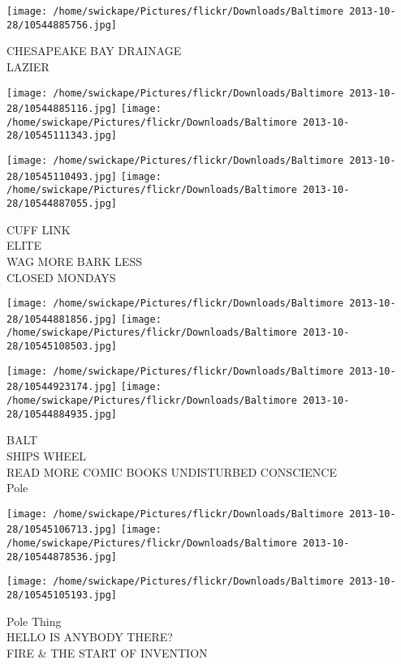 \documentclass[10pt,letterpaper]{article}
\begin{document}
\vspace{0.25in}
\texttt{[image: /home/swickape/Pictures/flickr/Downloads/Baltimore 2013-10-28/10544885756.jpg]}

CHESAPEAKE BAY DRAINAGE\\
LAZIER\\
\pagebreak

\texttt{[image: /home/swickape/Pictures/flickr/Downloads/Baltimore 2013-10-28/10544885116.jpg]}
\texttt{[image: /home/swickape/Pictures/flickr/Downloads/Baltimore 2013-10-28/10545111343.jpg]}

\texttt{[image: /home/swickape/Pictures/flickr/Downloads/Baltimore 2013-10-28/10545110493.jpg]}
\texttt{[image: /home/swickape/Pictures/flickr/Downloads/Baltimore 2013-10-28/10544887055.jpg]}

CUFF LINK\\
ELITE\\
WAG MORE BARK LESS\\
CLOSED MONDAYS\\
\pagebreak

\texttt{[image: /home/swickape/Pictures/flickr/Downloads/Baltimore 2013-10-28/10544881856.jpg]}
\texttt{[image: /home/swickape/Pictures/flickr/Downloads/Baltimore 2013-10-28/10545108503.jpg]}

\texttt{[image: /home/swickape/Pictures/flickr/Downloads/Baltimore 2013-10-28/10544923174.jpg]}
\texttt{[image: /home/swickape/Pictures/flickr/Downloads/Baltimore 2013-10-28/10544884935.jpg]}

BALT\\
SHIPS WHEEL\\
READ MORE COMIC BOOKS UNDISTURBED CONSCIENCE\\
Pole\\
\pagebreak

\texttt{[image: /home/swickape/Pictures/flickr/Downloads/Baltimore 2013-10-28/10545106713.jpg]}
\texttt{[image: /home/swickape/Pictures/flickr/Downloads/Baltimore 2013-10-28/10544878536.jpg]}

\vspace{0.25in}
\texttt{[image: /home/swickape/Pictures/flickr/Downloads/Baltimore 2013-10-28/10545105193.jpg]}

Pole Thing\\
HELLO IS ANYBODY THERE?\\
FIRE \& THE START OF INVENTION\\
\pagebreak
\end{document}
